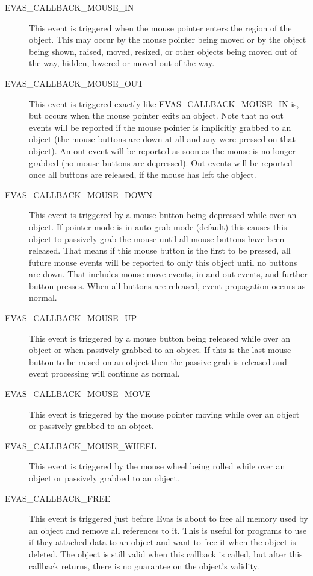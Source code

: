 \documentclass[a4paper]{profusion}
\begin{document}
\begin{description}
\item[EVAS\_CALLBACK\_MOUSE\_IN] This event is triggered when the
  mouse pointer enters the region of the object. This may occur by the
  mouse pointer being moved or by the object being shown, raised,
  moved, resized, or other objects being moved out of the way, hidden,
  lowered or moved out of the way.

\item[EVAS\_CALLBACK\_MOUSE\_OUT] This event is triggered exactly like
  EVAS\_CALLBACK\_MOUSE\_IN is, but occurs when the mouse pointer
  exits an object.  Note that no out events will be reported if the
  mouse pointer is implicitly grabbed to an object (the mouse buttons
  are down at all and any were pressed on that object). An out event
  will be reported as soon as the mouse is no longer grabbed (no mouse
  buttons are depressed). Out events will be reported once all buttons
  are released, if the mouse has left the object.

\item[EVAS\_CALLBACK\_MOUSE\_DOWN] This event is triggered by a mouse
  button being depressed while over an object. If pointer mode is in
  auto-grab mode (default) this causes this object to passively grab
  the mouse until all mouse buttons have been released.  That means if
  this mouse button is the first to be pressed, all future mouse
  events will be reported to only this object until no buttons are
  down. That includes mouse move events, in and out events, and
  further button presses. When all buttons are released, event
  propagation occurs as normal.

\item[EVAS\_CALLBACK\_MOUSE\_UP] This event is triggered by a mouse
  button being released while over an object or when passively grabbed
  to an object. If this is the last mouse button to be raised on an
  object then the passive grab is released and event processing will
  continue as normal.

\item[EVAS\_CALLBACK\_MOUSE\_MOVE]This event is triggered by the mouse
  pointer moving while over an object or passively grabbed to an
  object.

\item[EVAS\_CALLBACK\_MOUSE\_WHEEL] This event is triggered by the
  mouse wheel being rolled while over an object or passively grabbed
  to an object.

\item[EVAS\_CALLBACK\_FREE] This event is triggered just before Evas
  is about to free all memory used by an object and remove all
  references to it. This is useful for programs to use if they
  attached data to an object and want to free it when the object is
  deleted. The object is still valid when this callback is called, but
  after this callback returns, there is no guarantee on the object's
  validity.


\end{description}
\end{document}

